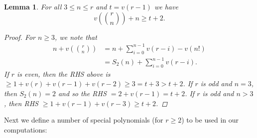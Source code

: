 \documentclass[11pt, reqno]{amsart}
\numberwithin{equation}{section}
\newtheorem{lemma}[thm]{Lemma}
\theoremstyle{definition}
\theoremstyle{remark}
\theoremstyle{definition}
\theoremstyle{remark}
\theoremstyle{remark}
\begin{document}
 \begin{lemma}\label{CMB2}
 For all $3\leq n\leq r$ and $t=v(r-1)$ we have
 \begin{equation}v\left({r\choose n}\right)+n\geq t+2.
 \end{equation}
\begin{proof}
For $n\geq 3$, we note that
    \begin{align*}	
	n+v\left({r \choose n}\right) 
&=\displaystyle
     n+\sum_{i=0}^{n-1}v(r-i)-v(n!)\\
	        & =S_2(n)+\sum_{i=0}^{n-1}v(r-i).
\end{align*}
If $r$ is even, then the RHS above is $\geq 1+v(r)+v(r-1)+v(r-2)\geq 3=t+3>t+2$. If $r$ is odd and $n=3$, then $S_2(n)=2$ and so the RHS 
$= 2+v(r-1)=t+2$. 
If $r$ is odd and $n>3$, then RHS $\geq 1+v(r-1)+v(r-3)\geq t+2$. 
\end{proof}     
 \end{lemma}
     


Next we define a number of special polynomials (for $r\geq2$) to be used in our computations:
\end{document}
